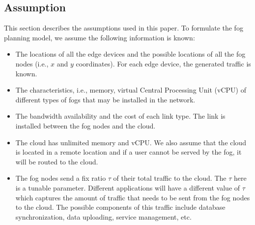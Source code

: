 \documentclass[10pt,journal,compsoc]{IEEEtran}
\begin{document}
\subsection{Assumption}\label{assumption}
This section describes the assumptions used in this paper.  
To formulate the fog planning model, we assume the following information is known:  
\begin{itemize}
\item The locations of all the edge devices and the possible locations of all the fog nodes (i.e., $x$ and $y$ coordinates). For each edge device, the generated traffic is known.
\item The characteristics, i.e., memory, virtual Central Processing Unit (vCPU) of different types of fogs that may be installed in the network.
\item The bandwidth availability and the cost of each link type. The link is installed between the fog nodes and the cloud.
\item The cloud has unlimited memory and vCPU. We also assume that the cloud is located in a remote location and if a user cannot be served by the fog, it will be routed to the cloud.
\item The fog nodes send a fix ratio $\tau$ of their total traffic to the cloud. The $\tau$ here is a tunable parameter. Different applications will have a different value of $\tau$ which captures the amount of traffic that needs to be sent from the fog nodes to the cloud. The possible components of this traffic include database synchronization, data uploading, service management, etc.
\end{itemize}
\iffalse
\end{document}
